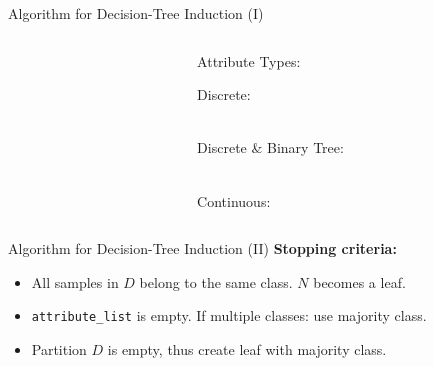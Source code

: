 \begin{frame}{Algorithm for Decision-Tree Induction (I)}
\begin{columns}
\begin{column}{0.75\textwidth}
		\end{column}
		\begin{column}{0.25\textwidth}
			\vspace*{-3em}
			\centering

			Attribute Types:
			\small

			Discrete:
			\begin{figure}[t]
				\centering
				
			\end{figure}
			~ \\\bigskip
			Discrete \& Binary Tree:
			\begin{figure}[t]
				\centering
				
			\end{figure}

			~ \\\bigskip
			Continuous:
			\begin{figure}[t]
				\centering
				
			\end{figure}

		\end{column}
	\end{columns}


\end{frame}

\begin{frame}{Algorithm for Decision-Tree Induction (II)}
	\textbf{Stopping criteria:}
	\begin{itemize}
		\item All samples in $D$ belong to the same class. $N$ becomes a leaf.
		\item \texttt{attribute\_list} is empty. If multiple classes: use majority class.
		\item Partition $D$ is empty, thus create leaf with majority class.
	\end{itemize}
\end{frame}

